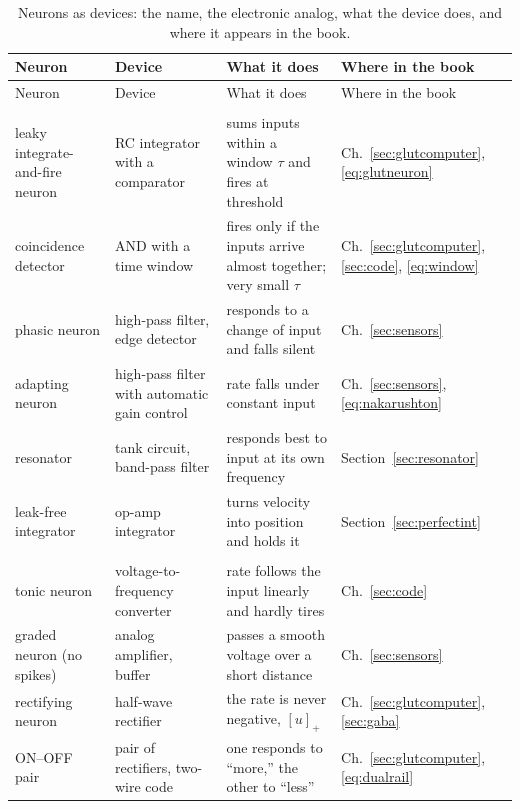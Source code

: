 \begin{center}
\footnotesize
\setlength{\tabcolsep}{3pt}
\renewcommand{\arraystretch}{1.15}
\begin{longtable}{>{\raggedright}p{3.1cm}>{\raggedright}p{3.3cm}>{\raggedright}p{4.7cm}>{\raggedright\arraybackslash}p{2.4cm}}
\caption{Neurons as devices: the name, the electronic analog, what the device does, and where it appears in the book.}\label{tab:eetypes}\\
\toprule
Neuron & Device & What it does & Where in the book \\
\midrule
\endfirsthead
\toprule
Neuron & Device & What it does & Where in the book \\
\midrule
\endhead
\bottomrule
\endfoot
\multicolumn{4}{l}{\emph{Filters and integrators}} \\
leaky integrate-and-fire neuron & RC integrator with a comparator & sums inputs within a window $\tau$ and fires at threshold & Ch.~\ref{sec:glutcomputer}, \eqref{eq:glutneuron} \\
coincidence detector & AND with a time window & fires only if the inputs arrive almost together; very small $\tau$ & Ch.~\ref{sec:glutcomputer}, \ref{sec:code}, \eqref{eq:window} \\
phasic neuron & high-pass filter, edge detector & responds to a change of input and falls silent & Ch.~\ref{sec:sensors} \\
adapting neuron & high-pass filter with automatic gain control & rate falls under constant input & Ch.~\ref{sec:sensors}, \eqref{eq:nakarushton} \\
resonator & tank circuit, band-pass filter & responds best to input at its own frequency & Section~\ref{sec:resonator} \\
leak-free integrator & op-amp integrator & turns velocity into position and holds it & Section~\ref{sec:perfectint} \\
\midrule
\multicolumn{4}{l}{\emph{Converters}} \\
tonic neuron & voltage-to-frequency converter & rate follows the input linearly and hardly tires & Ch.~\ref{sec:code} \\
graded neuron (no spikes) & analog amplifier, buffer & passes a smooth voltage over a short distance & Ch.~\ref{sec:sensors} \\
rectifying neuron & half-wave rectifier & the rate is never negative, $[u]_+$ & Ch.~\ref{sec:glutcomputer}, \ref{sec:gaba} \\
ON--OFF pair & pair of rectifiers, two-wire code & one responds to ``more,'' the other to ``less'' & Ch.~\ref{sec:glutcomputer}, \eqref{eq:dualrail} \\

\end{longtable}
\end{center}
